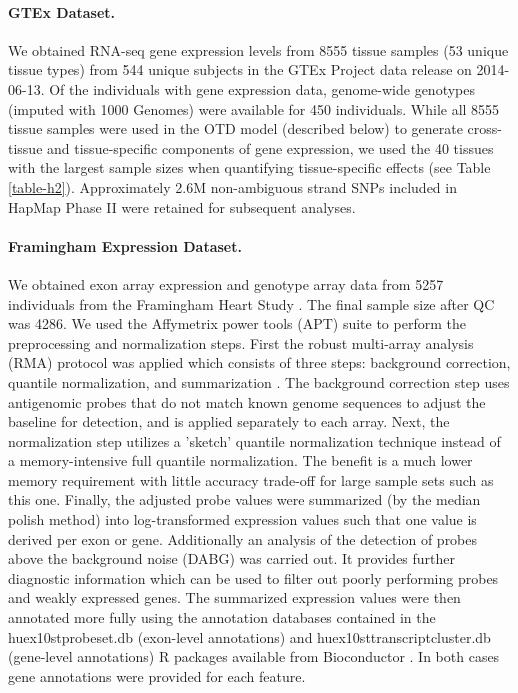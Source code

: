 \documentclass[10pt,letterpaper]{article}
\begin{document}
\paragraph*{GTEx Dataset.}\label{gtex-dataset}

We obtained RNA-seq gene expression levels from 8555 tissue samples (53
unique tissue types) from 544 unique subjects in the GTEx Project \cite{Ardlie_2015} 
data release on 2014-06-13. Of the individuals with gene
expression data, genome-wide genotypes (imputed with 1000 Genomes) were
available for 450 individuals. While all 8555 tissue samples were used
in the OTD model (described below) to generate cross-tissue and
tissue-specific components of gene expression, we used the 40 tissues
with the largest sample sizes when quantifying tissue-specific effects (see Table \ref{table-h2}).
Approximately 2.6M non-ambiguous strand SNPs included in HapMap Phase II were retained for
subsequent analyses.

\paragraph*{Framingham Expression Dataset.}\label{framingham-dataset}

We obtained exon array expression and genotype array data from 5257 individuals from the Framingham Heart Study \cite{Zhang_2015}. The final sample size after QC was 4286. We used the Affymetrix power tools (APT) suite to perform the preprocessing and normalization steps. First the robust multi-array analysis (RMA) protocol was applied which consists of three steps: background correction, quantile normalization, and summarization \cite{irizarry2003summaries}. The background correction step uses antigenomic probes that do not match known genome sequences to adjust the baseline for detection, and is applied separately to each array. Next, the normalization step utilizes a 'sketch' quantile normalization technique instead of a memory-intensive full quantile normalization. The benefit is a much lower memory requirement with little accuracy trade-off for large sample sets such as this one. Finally, the adjusted probe values were summarized (by the median polish method) into log-transformed expression values such that one value is derived per exon or gene. Additionally an analysis of the detection of probes above the background noise (DABG) was carried out. It provides further diagnostic information which can be used to filter out poorly performing probes and weakly expressed genes.  The summarized expression values were then annotated more fully using the annotation databases contained in the huex10stprobeset.db (exon-level annotations) and huex10sttranscriptcluster.db (gene-level annotations) R packages available from Bioconductor \cite{MacDonald_1,MacDonald_2}. In both cases gene annotations were provided for each feature. 
\end{document}
